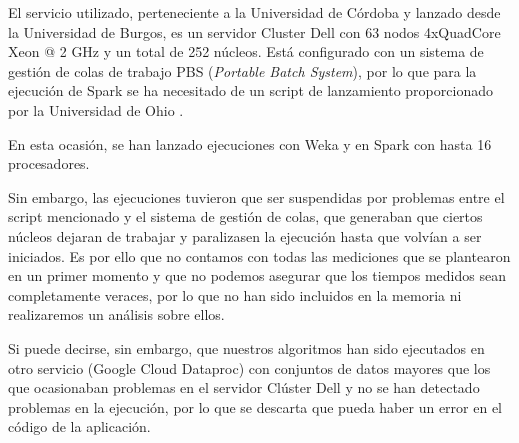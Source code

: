 El servicio utilizado, perteneciente a la Universidad de Córdoba y lanzado desde la Universidad de Burgos, es un servidor Cluster Dell con 63 nodos 4xQuadCore Xeon @ 2 GHz y un total de 252 núcleos. Está configurado con un sistema de gestión de colas de trabajo PBS (\textit{Portable Batch System}), por lo que para la ejecución de Spark se ha necesitado de un script de lanzamiento proporcionado por la Universidad de Ohio \cite{baer2015integrating}.

En esta ocasión, se han lanzado ejecuciones con Weka y en Spark con hasta 16 procesadores.

Sin embargo, las ejecuciones tuvieron que ser suspendidas por problemas entre el script mencionado y el sistema de gestión de colas, que generaban que ciertos núcleos dejaran de trabajar y paralizasen la ejecución hasta que volvían a ser iniciados. Es por ello que no contamos con todas las mediciones que se plantearon en un primer momento y que no podemos asegurar que los tiempos medidos sean completamente veraces, por lo que no han sido incluidos en la memoria ni realizaremos un análisis sobre ellos.

Si puede decirse, sin embargo, que nuestros algoritmos han sido ejecutados en otro servicio (Google Cloud Dataproc) con conjuntos de datos mayores que los que ocasionaban problemas en el servidor Clúster Dell y no se han detectado problemas en la ejecución, por lo que se descarta que pueda haber un error en el código de la aplicación.


